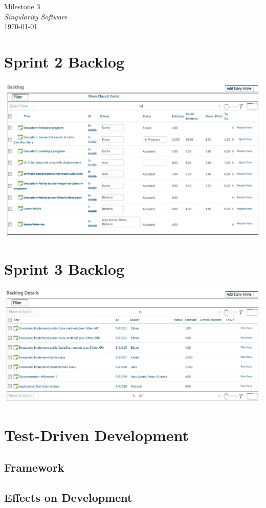 \documentclass[12pt]{article}
\begin{document}
\begin{center}
	\LARGE{Milestone 3} \\
	\Large{\textit{Singularity Software}} \\
	\vspace{.05in}
	\normalsize{\today} \\
\end{center}

\section*{Sprint 2 Backlog}
\includegraphics[scale=.63]{pdfs/MS2VersionOne/OldSprintBacklog_cropped.pdf}

\clearpage

\section*{Sprint 3 Backlog}
\includegraphics[scale=.63]{pdfs/MS2VersionOne/NewSprintBacklog_cropped.pdf}

\section*{Test-Driven Development}

\subsection*{Framework}


\subsection*{Effects on Development}

        
\end{document}

